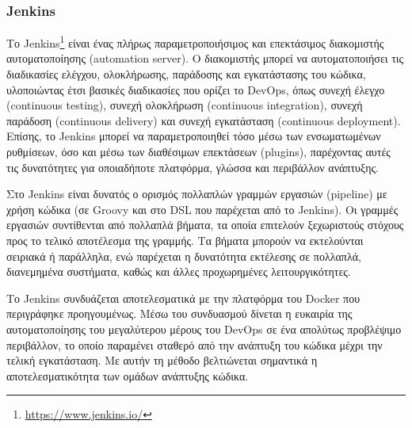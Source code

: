 \subsubsection{Jenkins} \label{subsection:4-2-1-3-jenkins}


Το Jenkins\footnote{\url{https://www.jenkins.io/}} είναι ένας πλήρως παραμετροποιήσιμος και επεκτάσιμος διακομιστής αυτοματοποίησης (\textenglish{automation server}). Ο διακομιστής μπορεί να αυτοματοποιήσει τις διαδικασίες ελέγχου, ολοκλήρωσης, παράδοσης και εγκατάστασης του κώδικα, υλοποιώντας έτσι βασικές διαδικασίες που ορίζει το DevOps, όπως συνεχή έλεγχο (\textenglish{continuous testing}), συνεχή ολοκλήρωση (\textenglish{continuous integration}), συνεχή παράδοση (\textenglish{continuous delivery}) και συνεχή εγκατάσταση (\textenglish{continuous deployment}). Επίσης, το Jenkins μπορεί να παραμετροποιηθεί τόσο μέσω των ενσωματωμένων ρυθμίσεων, όσο και μέσω των διαθέσιμων επεκτάσεων (plugins), παρέχοντας αυτές τις δυνατότητες για οποιαδήποτε πλατφόρμα, γλώσσα και περιβάλλον ανάπτυξης.

Στο Jenkins είναι δυνατός ο ορισμός πολλαπλών γραμμών εργασιών (pipeline) με χρήση κώδικα (σε Groovy και στο DSL που παρέχεται από το Jenkins). Οι γραμμές εργασιών συντίθενται από πολλαπλά βήματα, τα οποία επιτελούν ξεχωριστούς στόχους προς το τελικό αποτέλεσμα της γραμμής. Τα βήματα μπορούν να εκτελούνται σειριακά ή παράλληλα, ενώ παρέχεται η δυνατότητα εκτέλεσης σε πολλαπλά, διανεμημένα συστήματα, καθώς και άλλες προχωρημένες λειτουργικότητες.

Το Jenkins συνδυάζεται αποτελεσματικά με την πλατφόρμα του Docker που περιγράφηκε προηγουμένως. Μέσω του συνδυασμού δίνεται η ευκαιρία της αυτοματοποίησης του μεγαλύτερου μέρους του DevOps σε ένα απολύτως προβλέψιμο περιβάλλον, το οποίο παραμένει σταθερό από την ανάπτυξη του κώδικα μέχρι την τελική εγκατάσταση. Με αυτήν τη μέθοδο βελτιώνεται σημαντικά η αποτελεσματικότητα των ομάδων ανάπτυξης κώδικα.

